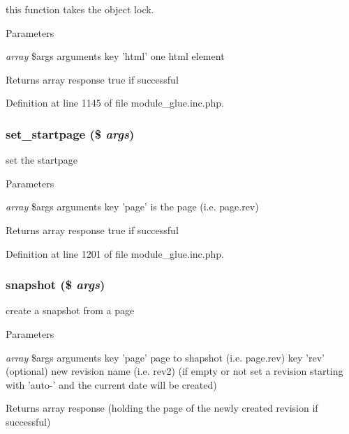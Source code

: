 this function takes the object lock. 
\begin{DoxyParams}{Parameters}
\item[{\em array}]\$args arguments key 'html' one html element \end{DoxyParams}
\begin{DoxyReturn}{Returns}
array response true if successful 
\end{DoxyReturn}


Definition at line 1145 of file module\_\-glue.inc.php.

\hypertarget{module__glue_8inc_8php_aafa7a8fa046ff6119cb7506d68edf787}{
\subsubsection[{set\_\-startpage}]{\setlength{\rightskip}{0pt plus 5cm}set\_\-startpage (\$ {\em args})}}
\label{module__glue_8inc_8php_aafa7a8fa046ff6119cb7506d68edf787}
set the startpage


\begin{DoxyParams}{Parameters}
\item[{\em array}]\$args arguments key 'page' is the page (i.e. page.rev) \end{DoxyParams}
\begin{DoxyReturn}{Returns}
array response true if successful 
\end{DoxyReturn}


Definition at line 1201 of file module\_\-glue.inc.php.

\hypertarget{module__glue_8inc_8php_a5d3ad02088eee566589cd47fe0dc889a}{
\subsubsection[{snapshot}]{\setlength{\rightskip}{0pt plus 5cm}snapshot (\$ {\em args})}}
\label{module__glue_8inc_8php_a5d3ad02088eee566589cd47fe0dc889a}
create a snapshot from a page


\begin{DoxyParams}{Parameters}
\item[{\em array}]\$args arguments key 'page' page to shapshot (i.e. page.rev) key 'rev' (optional) new revision name (i.e. rev2) (if empty or not set a revision starting with 'auto-\/' and the current date will be created) \end{DoxyParams}
\begin{DoxyReturn}{Returns}
array response (holding the page of the newly created revision if successful) 
\end{DoxyReturn}


